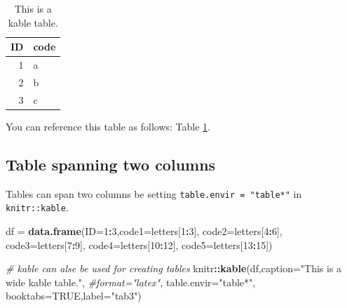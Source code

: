 \documentclass[webpdf,large,contemporary,namedate]{oup-authoring-template}
\newenvironment{Shaded}{\begin{snugshade}}{\end{snugshade}}
\newcommand{\AttributeTok}[1]{\textcolor[rgb]{0.13,0.29,0.53}{#1}}
\newcommand{\CommentTok}[1]{\textcolor[rgb]{0.56,0.35,0.01}{\textit{#1}}}
\newcommand{\ConstantTok}[1]{\textcolor[rgb]{0.56,0.35,0.01}{#1}}
\newcommand{\DecValTok}[1]{\textcolor[rgb]{0.00,0.00,0.81}{#1}}
\newcommand{\FunctionTok}[1]{\textcolor[rgb]{0.13,0.29,0.53}{\textbf{#1}}}
\newcommand{\NormalTok}[1]{#1}
\newcommand{\OtherTok}[1]{\textcolor[rgb]{0.56,0.35,0.01}{#1}}
\newcommand{\SpecialCharTok}[1]{\textcolor[rgb]{0.81,0.36,0.00}{\textbf{#1}}}
\newcommand{\StringTok}[1]{\textcolor[rgb]{0.31,0.60,0.02}{#1}}
\theoremstyle{thmstyleone}
\theoremstyle{thmstyletwo}
\theoremstyle{thmstylethree}
\begin{document}
\begin{table}

\caption{\label{tab:tab2}This is a kable table.}
\centering
\begin{tabular}[t]{rl}
\toprule
ID & code\\
\midrule
1 & a\\
2 & b\\
3 & c\\
\bottomrule
\end{tabular}
\end{table}

You can reference this table as follows: Table \ref{tab:tab2}.

\hypertarget{table-spanning-two-columns}{%
\subsection{Table spanning two
columns}\label{table-spanning-two-columns}}

Tables can span two columns be setting \texttt{table.envir\ =\ "table*"}
in \texttt{knitr::kable}.

\begin{Shaded}
\begin{Highlighting}[]
\NormalTok{df }\OtherTok{=} \FunctionTok{data.frame}\NormalTok{(}\AttributeTok{ID=}\DecValTok{1}\SpecialCharTok{:}\DecValTok{3}\NormalTok{,}\AttributeTok{code1=}\NormalTok{letters[}\DecValTok{1}\SpecialCharTok{:}\DecValTok{3}\NormalTok{],}
                \AttributeTok{code2=}\NormalTok{letters[}\DecValTok{4}\SpecialCharTok{:}\DecValTok{6}\NormalTok{],}
                \AttributeTok{code3=}\NormalTok{letters[}\DecValTok{7}\SpecialCharTok{:}\DecValTok{9}\NormalTok{],}
                \AttributeTok{code4=}\NormalTok{letters[}\DecValTok{10}\SpecialCharTok{:}\DecValTok{12}\NormalTok{],}
                \AttributeTok{code5=}\NormalTok{letters[}\DecValTok{13}\SpecialCharTok{:}\DecValTok{15}\NormalTok{])}

\CommentTok{\# kable can alse be used for creating tables}
\NormalTok{knitr}\SpecialCharTok{::}\FunctionTok{kable}\NormalTok{(df,}\AttributeTok{caption=}\StringTok{"This is a wide kable table."}\NormalTok{,}
             \CommentTok{\#format="latex",}
             \AttributeTok{table.envir=}\StringTok{"table*"}\NormalTok{,}
             \AttributeTok{booktabs=}\ConstantTok{TRUE}\NormalTok{,}\AttributeTok{label=}\StringTok{"tab3"}\NormalTok{)}
\end{Highlighting}
\end{Shaded}
\end{document}
